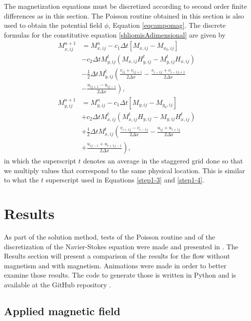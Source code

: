 \documentclass[journal]{IEEEtran}
\begin{document}
The magnetization equations must be discretized according to second order finite differences as in this section. The Poisson routine obtained in this section is also used to obtain the potential field $\phi$, Equation \ref{eqcampomag}. The discrete formulas for the constitutive equation \ref{shliomisAdimensional} are given by \begin{align}
M_{x,ij}^{n+1} & = M_{x,ij}^n -c_1\Delta t[M_{x,ij} - M_{x_0,ij}] \nonumber\\&-c_2 \Delta t M_{y,ij}^t(M_{x,ij} H_{y,ij}^t - M_{y,ij}^t H_{x,ij})\nonumber \\
&-\frac{1}{2}\Delta t M_{y,ij}^t\left(\frac{v_{ij} + v_{ij+1}}{2\Delta x} - \frac{v_{i-1j} + v_{i-1j+1}}{2\Delta x} \right.\nonumber\\  &- \left.\frac{u_{ij+1} - u_{ij-1}}{2\Delta x}\right),
\end{align}
\begin{align}
M_{y,ij}^{n+1} & = M_{y,ij}^n -c_1\Delta t[M_{y,ij} - M_{y_0,ij}]\nonumber\\ &+c_2\Delta t M_{x,ij}^t(M_{x,ij}^t H_{y,ij} - M_{y,ij} H_{x,ij}^t)\nonumber \\
 &+\frac{1}{2}\Delta tM_{x,ij}^t\left(\frac{v_{i+1j} - v_{i-1j}}{2\Delta x} - \frac{u_{ij} + u_{i+1j}}{2\Delta x}\right.\nonumber\\ &\left.+ \frac{u_{ij-1} + u_{i+1j-1}}{2\Delta x}\right),\label{Mynext}
\end{align} in which the superscript $t$ denotes an average in the staggered grid done so that we multiply values that correspond to the same physical location. This is similar to what the $t$ superscript used in Equations \ref{step1-3} and \ref{step1-4}.

\section{Results}

As part of the solution method, tests of the Poisson routine and of the discretization of the Navier-Stokes equation were made and presented in \cite{ataias2015}. The Results section will present a comparison of the results for the flow without magnetism and with magnetism. Animations were made in order to better examine those results. The code to generate those is written in Python and is available at the GitHub repository \cite{gitHubFerrofluidos}.

\subsection{Applied magnetic field}
\end{document}
